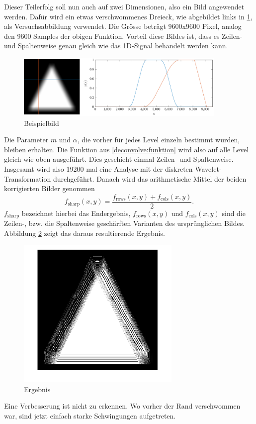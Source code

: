Dieser Teilerfolg soll nun auch auf zwei Dimensionen, also ein Bild angewendet werden.
Dafür wird ein etwas verschwommenes Dreieck, wie abgebildet links in \ref{deconvolve:example}, als Versuchsabbildung verwendet.
Die Grösse beträgt 9600x9600 Pixel, analog den 9600 Samples der obigen Funktion.
Vorteil diese Bildes ist, dass es Zeilen- und Spaltenweise genau gleich wie das 1D-Signal behandelt werden kann.
\begin{figure}[h]
\centering
\includegraphics[width=0.9\textwidth]{./papers/deconvolve/pictures/dreieck.pdf}
\caption{Beispielbild\label{deconvolve:example}}
\end{figure}

Die Parameter $m$ und $\alpha$, die vorher für jedes Level einzeln bestimmt wurden, bleiben erhalten.
Die Funktion aus \eqref{deconvolve:funktion} wird also auf alle Level gleich wie oben ausgeführt.
Dies geschieht einmal Zeilen- und Spaltenweise.
Insgesamt wird also 19200 mal eine Analyse mit der diskreten Wavelet-Transformation durchgeführt.
Danach wird das arithmetische Mittel der beiden korrigierten Bilder genommen
$$f_\text{sharp}(x,y)=\frac{f_\text{rows}(x,y)+f_\text{cols}(x,y)}{2}.$$
$f_\text{sharp}$ bezeichnet hierbei das Endergebnis, $f_\text{rows}(x,y)$ und $f_\text{cols}(x,y)$ sind die Zeilen-, bzw. die Spaltenweise \glqq geschärften\grqq{} Varianten des ursprünglichen Bildes.
Abbildung \ref{deconvolve:ergebnis} zeigt das daraus resultierende Ergebnis.
\begin{figure}[h]
\centering
\includegraphics[width=0.7\textwidth]{./papers/deconvolve/pictures/dreieck_sharp.png}
\caption{Ergebnis\label{deconvolve:ergebnis}}
\end{figure}
 
Eine Verbesserung ist nicht zu erkennen. Wo vorher der Rand verschwommen war, sind jetzt einfach starke Schwingungen aufgetreten.